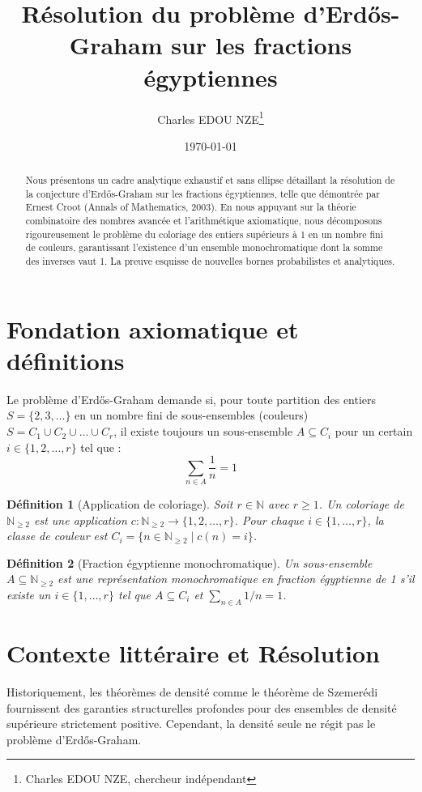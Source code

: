\documentclass[12pt,a4paper]{article}
\title{R\'esolution du probl\`eme d'Erd\H{o}s-Graham sur les fractions \'egyptiennes}
\author{Charles EDOU NZE\thanks{Charles EDOU NZE, chercheur ind\'ependant}}
\date{\today}
\newtheorem{definition}{D\'efinition}
\begin{document}
\maketitle

\begin{abstract}
Nous pr\'esentons un cadre analytique exhaustif et sans ellipse d\'etaillant la r\'esolution de la conjecture d'Erd\H{o}s-Graham sur les fractions \'egyptiennes, telle que d\'emontr\'ee par Ernest Croot (Annals of Mathematics, 2003). En nous appuyant sur la th\'eorie combinatoire des nombres avanc\'ee et l'arithm\'etique axiomatique, nous d\'ecomposons rigoureusement le probl\`eme du coloriage des entiers sup\'erieurs \`a 1 en un nombre fini de couleurs, garantissant l'existence d'un ensemble monochromatique dont la somme des inverses vaut 1. La preuve esquisse de nouvelles bornes probabilistes et analytiques.
\end{abstract}

\section{Fondation axiomatique et d\'efinitions}
Le probl\`eme d'Erd\H{o}s-Graham demande si, pour toute partition des entiers $S = \{2, 3, \dots\}$ en un nombre fini de sous-ensembles (couleurs) $S = C_1 \cup C_2 \cup \dots \cup C_r$, il existe toujours un sous-ensemble $A \subseteq C_i$ pour un certain $i \in \{1, 2, \dots, r\}$ tel que :
\begin{equation}
\sum_{n \in A} \frac{1}{n} = 1
\end{equation}

\begin{definition}[Application de coloriage]
Soit $r \in \mathbb{N}$ avec $r \geq 1$. Un coloriage de $\mathbb{N}_{\geq 2}$ est une application $c: \mathbb{N}_{\geq 2} \to \{1, 2, \dots, r\}$. Pour chaque $i \in \{1, \dots, r\}$, la classe de couleur est $C_i = \{n \in \mathbb{N}_{\geq 2} \mid c(n) = i\}$.
\end{definition}

\begin{definition}[Fraction \'egyptienne monochromatique]
Un sous-ensemble $A \subseteq \mathbb{N}_{\geq 2}$ est une repr\'esentation monochromatique en fraction \'egyptienne de 1 s'il existe un $i \in \{1, \dots, r\}$ tel que $A \subseteq C_i$ et $\sum_{n \in A} 1/n = 1$.
\end{definition}

\section{Contexte litt\'eraire et R\'esolution}
Historiquement, les th\'eor\`emes de densit\'e comme le th\'eor\`eme de Szemer\'edi fournissent des garanties structurelles profondes pour des ensembles de densit\'e sup\'erieure strictement positive. Cependant, la densit\'e seule ne r\'egit pas le probl\`eme d'Erd\H{o}s-Graham.
\end{document}

